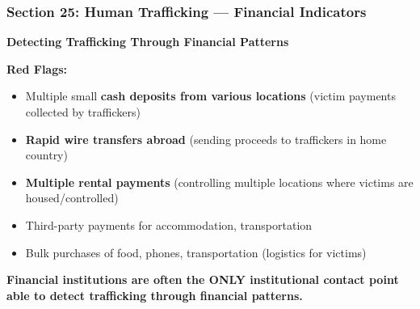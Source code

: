 \documentclass[12pt,aspectratio=169]{beamer}
\renewcommand{\scriptsize}{\fontsize{5}{6}\selectfont}
\newcommand{\keypoint}[1]{\textcolor{deepblue}{\textbf{#1}}}
\begin{document}
	\begin{frame}
		\frametitle{\fontsize{13}{15}\selectfont \textbf{Section 25: Human Trafficking — Financial Indicators}}
		\vspace{0.3cm}
		\begin{center}
			{\fontsize{12}{14}\selectfont \textbf{Detecting Trafficking Through Financial Patterns}}
		\end{center}
		\vspace{0.2cm}
		\begin{block}{}
			\scriptsize
			\textbf{Red Flags:}
			\begin{itemize}
				\item Multiple small \textbf{cash deposits from various locations} (victim payments collected by traffickers)
				\item \textbf{Rapid wire transfers abroad} (sending proceeds to traffickers in home country)
				\item \textbf{Multiple rental payments} (controlling multiple locations where victims are housed/controlled)
				\item Third-party payments for accommodation, transportation
				\item Bulk purchases of food, phones, transportation (logistics for victims)
			\end{itemize}
			\vspace{0.1cm}
			\keypoint{Financial institutions are often the ONLY institutional contact point able to detect trafficking through financial patterns.}
		\end{block}
	\end{frame}
	
\end{document}
